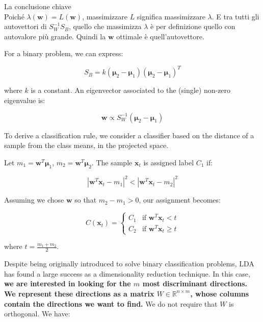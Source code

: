 \begin{tcolorbox}[colframe=blue!70!black, colback=white, sharp corners=southwest, left=2mm, boxrule=1pt, enhanced, breakable]
\vspace{0.5em}
La conclusione chiave \\ 
Poiché $\lambda(\mathbf{w}) = L(\mathbf{w})$, massimizzare $L$ significa massimizzare $\lambda$. E tra tutti gli autovettori di $S_W^{-1} S_B$, quello che massimizza $\lambda$ è per definizione quello con autovalore più grande. Quindi la $\mathbf{w}$ ottimale è quell'autovettore.
\end{tcolorbox}



For a binary problem, we can express:

\begin{equation*}
S_B = k(\boldsymbol{\mu}_2 - \boldsymbol{\mu}_1)(\boldsymbol{\mu}_2 - \boldsymbol{\mu}_1)^T
\end{equation*}

where $k$ is a constant. An eigenvector associated to the (single) non-zero eigenvalue is:

\begin{equation*}
\mathbf{w} \propto S_W^{-1}(\boldsymbol{\mu}_2 - \boldsymbol{\mu}_1)
\end{equation*}

To derive a classification rule, we consider a classifier based on the distance of a sample from the class means, in the projected space.

Let $m_1 = \mathbf{w}^T\boldsymbol{\mu}_1$, $m_2 = \mathbf{w}^T\boldsymbol{\mu}_2$. The sample $\mathbf{x}_t$ is assigned label $C_1$ if:

\begin{equation*}
|\mathbf{w}^T\mathbf{x}_t - m_1|^2 < |\mathbf{w}^T\mathbf{x}_t - m_2|^2
\end{equation*}

Assuming we chose $\mathbf{w}$ so that $m_2 - m_1 > 0$, our assignment becomes:

\begin{equation*}
C(\mathbf{x}_t) = \begin{cases} C_1 & \text{if } \mathbf{w}^T\mathbf{x}_t < t \\ C_2 & \text{if } \mathbf{w}^T\mathbf{x}_t \geq t \end{cases}
\end{equation*}

where $t = \frac{m_1 + m_2}{2}$.

\vspace{1em}
Despite being originally introduced to solve binary classification problems, LDA has found a large success as a dimensionality reduction technique. In this case, \textbf{we are interested in looking for the $m$ most discriminant directions. We represent these directions as a matrix $W \in \mathbb{R}^{n \times m}$, whose columns contain the directions we want to find.} We do not require that $W$ is orthogonal. We have:

